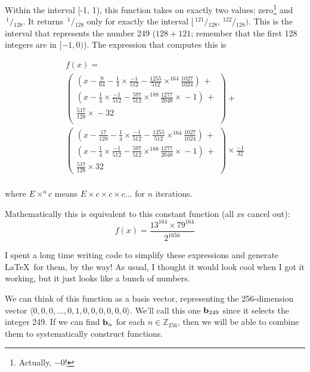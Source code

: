 \documentclass[twocolumn]{article}
\newcommand\sfrac[2]{\!{}\,^{#1}\!/{}\!_{#2}}
\newcommand\basis{\ensuremath{\textrm{\bf b}}}
\begin{document}

Within the interval [-1, 1), this function takes on exactly two
  values: zero\footnote{Actually, $-0$!} and $\sfrac{1}{128}$. It returns
  $\sfrac{1}{128}$ only for exactly the interval $[\sfrac{121}{128},
    \sfrac{122}{128})$. This is the interval that represents the
  number 249 ($128 + 121$; remember that the first 128 integers are in
  $[-1, 0)$). The expression that computes this is

\[
\begin{array}{l}
  f(x) = \\[0.5em]
  \left(
  \begin{array}{l}
    (x - \frac{9}{64} - \frac{1}{4} \times{} \frac{-1}{512} - \frac{1255}{512} \times^{\scriptscriptstyle 164} \frac{1027}{1024})\, + \\[0.5em]
    (x - \frac{1}{4} \times{} \frac{-1}{512} - \frac{597}{512} \times^{\scriptscriptstyle 188} \frac{1277}{2048} \times{} -\!1)\, + \\[0.5em]
    \frac{517}{128} \times{} -32 \\[0.5em]
  \end{array}
  \right) + \\[2em]
%
  \left(
  \begin{array}{l}
    (x - \frac{17}{128} - \frac{1}{4} \times{} \frac{-1}{512} - \frac{1255}{512} \times^{\scriptscriptstyle 164} \frac{1027}{1024})\, + \\[0.5em]
    (x - \frac{1}{4} \times{} \frac{-1}{512} - \frac{597}{512} \times^{\scriptscriptstyle 188} \frac{1277}{2048} \times{} -\!1)\, + \\[0.5em]
    \frac{517}{128} \times{} 32
  \end{array}
  \right) \times{} \frac{-1}{32} \\
\end{array}
\]

where $E \times^{n} c$ means $E \times c \times c \times c \ldots$ for $n$ iterations.

Mathematically this is equivalent to this constant function (all $x$s cancel out):
$$f(x) = \frac{13^{164} \times{} 79^{164}}{2^{1656}}$$

I spent a long time writing code to simplify these expressions and
generate \LaTeX\ for them, by the way! As usual, I thought it would
look cool when I got it working, but it just looks like a bunch of numbers.

We can think of this function as a basis vector, representing the 256-dimension
vector $\langle 0, 0, 0, \ldots, 0, 1, 0, 0, 0, 0, 0, 0 \rangle$. We'll call
this one $\basis_{249}$ since it selects the integer 249. If we can find $\basis_n$
for each $n \in \mathbb{Z}_{256}$, then we will be able to combine them
to systematically construct functions.
\end{document}
